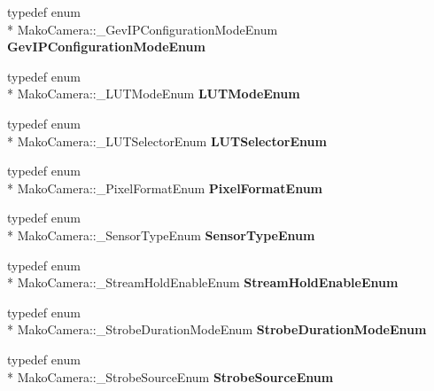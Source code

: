 \begin{DoxyCompactItemize}
\item 
\hypertarget{classMakoCamera_ac4b1fc144d1769dbaa4f9e6da1bd613d}{typedef enum \\*
Mako\-Camera\-::\-\_\-\-Gev\-I\-P\-Configuration\-Mode\-Enum {\bfseries Gev\-I\-P\-Configuration\-Mode\-Enum}}\label{classMakoCamera_ac4b1fc144d1769dbaa4f9e6da1bd613d}

\item 
\hypertarget{classMakoCamera_adfd02d69c7a6361504d67e59642e5be3}{typedef enum \\*
Mako\-Camera\-::\-\_\-\-L\-U\-T\-Mode\-Enum {\bfseries L\-U\-T\-Mode\-Enum}}\label{classMakoCamera_adfd02d69c7a6361504d67e59642e5be3}

\item 
\hypertarget{classMakoCamera_aafc0870e522f6456cb83b3ec50cddb4f}{typedef enum \\*
Mako\-Camera\-::\-\_\-\-L\-U\-T\-Selector\-Enum {\bfseries L\-U\-T\-Selector\-Enum}}\label{classMakoCamera_aafc0870e522f6456cb83b3ec50cddb4f}

\item 
\hypertarget{classMakoCamera_aae0a89ae73a47771e623107d920c47b6}{typedef enum \\*
Mako\-Camera\-::\-\_\-\-Pixel\-Format\-Enum {\bfseries Pixel\-Format\-Enum}}\label{classMakoCamera_aae0a89ae73a47771e623107d920c47b6}

\item 
\hypertarget{classMakoCamera_ab4059344d03db601ed8ea4cdcb9d4750}{typedef enum \\*
Mako\-Camera\-::\-\_\-\-Sensor\-Type\-Enum {\bfseries Sensor\-Type\-Enum}}\label{classMakoCamera_ab4059344d03db601ed8ea4cdcb9d4750}

\item 
\hypertarget{classMakoCamera_aea6e59669de557f0e84e111c5367c0cd}{typedef enum \\*
Mako\-Camera\-::\-\_\-\-Stream\-Hold\-Enable\-Enum {\bfseries Stream\-Hold\-Enable\-Enum}}\label{classMakoCamera_aea6e59669de557f0e84e111c5367c0cd}

\item 
\hypertarget{classMakoCamera_a187e0a50a19146409952d83b4d930b32}{typedef enum \\*
Mako\-Camera\-::\-\_\-\-Strobe\-Duration\-Mode\-Enum {\bfseries Strobe\-Duration\-Mode\-Enum}}\label{classMakoCamera_a187e0a50a19146409952d83b4d930b32}

\item 
\hypertarget{classMakoCamera_a4241f2e20b6fadbc4ab323e4cbc7b2c0}{typedef enum \\*
Mako\-Camera\-::\-\_\-\-Strobe\-Source\-Enum {\bfseries Strobe\-Source\-Enum}}\label{classMakoCamera_a4241f2e20b6fadbc4ab323e4cbc7b2c0}


\end{DoxyCompactItemize}
